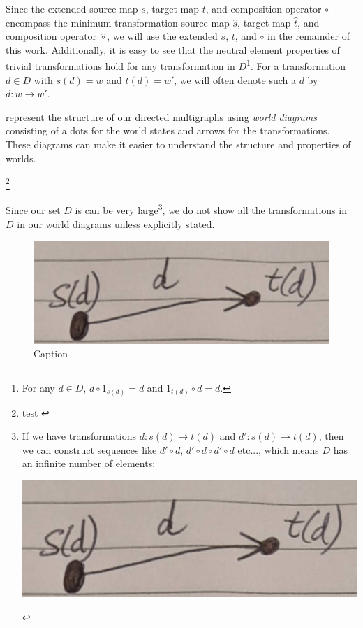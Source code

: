 Since the extended source map $s$, target map $t$, and composition operator $\circ$ encompass the minimum transformation source map $\hat{s}$, target map $\hat{t}$, and composition operator $\hat{\circ}$, we will use the extended $s$, $t$, and $\circ$ in the remainder of this work.
Additionally, it is easy to see that the neutral element properties of trivial transformations hold for any transformation in $D$\footnote{For any $d \in D$, $d \circ 1_{s(d)} = d$ and $1_{t(d)} \circ d = d$.}.
For a transformation $d \in D$ with $s(d) = w$ and $t(d) = w'$, we will often denote such a $d$ by $d: w \to w'$.




 represent the structure of our directed multigraphs using \emph{world diagrams} consisting of a dots for the world states and arrows for the transformations.
These diagrams can make it easier to understand the structure and properties of worlds.


\autocite{barr1990category}\footnote{test 
\autocite{barr1990category}
}

Since our set $D$ is can be very large\footnote{
If we have transformations $d: s(d) \to t(d)$ and $d': s(d) \to t(d)$, then we can construct sequences like $d' \circ d$, $d' \circ d \circ d' \circ d$ etc..., which means $D$ has an infinite number of elements:
\begin{center}
    \includegraphics[width=0.5\linewidth]{2MathematicalFramework/InitialFramework/Images/transformation.jpg}
\end{center}
}, we do not show all the transformations in $D$ in our world diagrams unless explicitly stated.


\begin{figure}
    \centering
    \includegraphics[width=0.5\linewidth]{2MathematicalFramework/InitialFramework/Images/transformation.jpg}
    \caption{Caption}
    \label{fig:transformation}
\end{figure}

